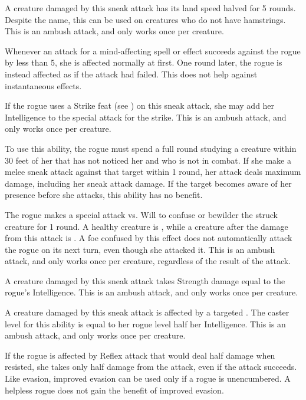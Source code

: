  A creature damaged by this sneak attack has its land speed halved for 5 rounds. Despite the name, this can be used on creatures who do not have hamstrings. This is an ambush attack, and only works once per creature.

 Whenever an attack for a mind-affecting spell or effect succeeds against the rogue by less than 5, she is affected normally at first. One round later, the rogue is instead affected as if the attack had failed. This does not help against instantaneous effects.

 If the rogue uses a Strike feat (see ) on this sneak attack, she may add her Intelligence to the special attack for the strike. This is an ambush attack, and only works once per creature.

 To use this ability, the rogue must spend a full round studying a creature within 30 feet of her that has not noticed her and who is not in combat. If she make a melee sneak attack against that target within 1 round, her attack deals maximum damage, including her sneak attack damage. If the target becomes aware of her presence before she attacks, this ability has no benefit.

 The rogue makes a special attack vs. Will to confuse or bewilder the struck creature for 1 round. A healthy creature is \bewildered, while a creature \bloodied after the damage from this attack is \confused. A foe confused by this effect does not automatically attack the rogue on its next turn, even though she attacked it. This is an ambush attack, and only works once per creature, regardless of the result of the attack.

 A creature damaged by this sneak attack takes Strength damage equal to the rogue's Intelligence. This is an ambush attack, and only works once per creature.

 A creature damaged by this sneak attack is affected by a targeted . The caster level for this ability is equal to her rogue level \add half her Intelligence. This is an ambush attack, and only works once per creature.

 If the rogue is affected by Reflex attack that would deal half damage when resisted, she takes only half damage from the attack, even if the attack succeeds. Like evasion, improved evasion can be used only if a rogue is unencumbered. A helpless rogue does not gain the benefit of improved evasion.

